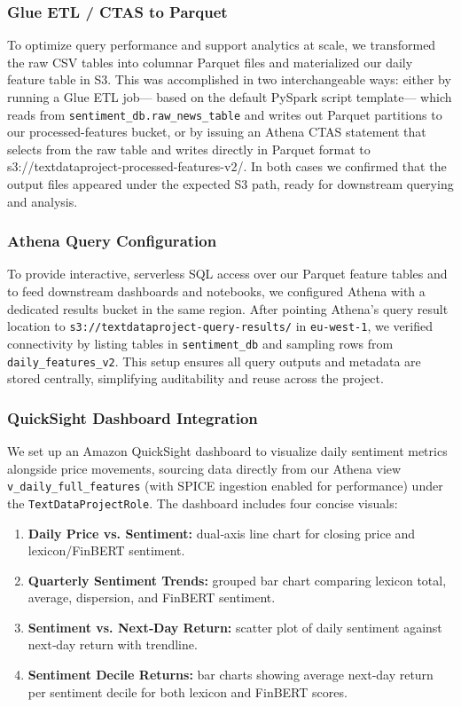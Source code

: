 \documentclass[11pt,a4paper]{article}
\begin{document}
\subsubsection{Glue ETL / CTAS to Parquet}

To optimize query performance and support analytics at scale, we transformed the raw CSV tables into columnar Parquet files and materialized our daily feature table in S3. This was accomplished in two interchangeable ways: either by running a Glue ETL job— based on the default PySpark script template— which reads from \texttt{sentiment\_db.raw\_news\_table} and writes out Parquet partitions to our processed-features bucket, or by issuing an Athena CTAS statement that selects from the raw table and writes directly in Parquet format to s3://textdataproject-processed-features-v2/. In both cases we confirmed that the output files appeared under the expected S3 path, ready for downstream querying and analysis.  

\subsubsection{Athena Query Configuration}

To provide interactive, serverless SQL access over our Parquet feature tables and to feed downstream dashboards and notebooks, we configured Athena with a dedicated results bucket in the same region. After pointing Athena's query result location to \texttt{s3://textdataproject-query-results/} in \texttt{eu-west-1}, we verified connectivity by listing tables in \texttt{sentiment\_db} and sampling rows from \texttt{daily\_features\_v2}. This setup ensures all query outputs and metadata are stored centrally, simplifying auditability and reuse across the project.  

\subsubsection{QuickSight Dashboard Integration}

We set up an Amazon QuickSight dashboard to visualize daily sentiment metrics alongside price movements, sourcing data directly from our Athena view \texttt{v\_daily\_full\_features} (with SPICE ingestion enabled for performance) under the \texttt{TextDataProjectRole}. The dashboard includes four concise visuals:

\begin{enumerate}
  \item \textbf{Daily Price vs. Sentiment:} dual‐axis line chart for closing price and lexicon/FinBERT sentiment.  
  \item \textbf{Quarterly Sentiment Trends:} grouped bar chart comparing lexicon total, average, dispersion, and FinBERT sentiment.  
  \item \textbf{Sentiment vs. Next‐Day Return:} scatter plot of daily sentiment against next‐day return with trendline.  
  \item \textbf{Sentiment Decile Returns:} bar charts showing average next‐day return per sentiment decile for both lexicon and FinBERT scores.  
\end{enumerate}
\end{document}
